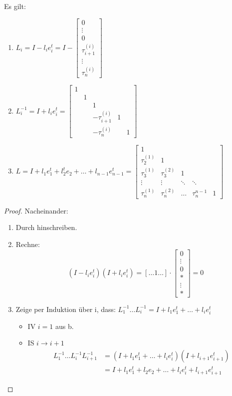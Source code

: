 \begin{lemma}
	Es gilt:
	\begin{enumerate}
		\item $L_i = I-l_i e_i^{t} = I- \begin{bmatrix}
		0 \\ \vdots \\ 0 \\ \tau_{i+1}^{(i)} \\ \vdots \\ \tau_n^{(i)}
		\end{bmatrix}$ 
		\item $L_i^{-1} = I+ l_i e_i^{t} = \begin{bmatrix}
			1 & & & & \\
                  & 1 & & & \\
                  & & 1 & & \\
                  & & -\tau_{i+1}^{(i)}& 1 & \\
                  & & -\tau_n^{(i)}& & 1
		\end{bmatrix}$
	\item $L= I+ l_1e_1^{t}+ l_2^{t}e_2+\ldots+ l_{n-1} e_{n-1}^{t}= \begin{bmatrix}
			1 & \\
			\tau_2^{(1)} & 1 \\
			\tau_3^{(1)} & \tau_3^{(2)} & 1 \\
			\vdots & \vdots & \ddots & \ddots \\
			\tau_n^{(1)} & \tau_n^{(2)} &  \ldots &\tau_n^{n-1} & 1
	\end{bmatrix}$ 
	\end{enumerate}

\end{lemma}
\begin{proof} Nacheinander:
\begin{enumerate}
	\item Durch hinschreiben.
	\item Rechne: 
		\[
			(I-l_i e_i^{t}) (I+l_ie_i^{t}) = [\ldots 1 \ldots] \cdot \begin{bmatrix}
				0 \\ \vdots \\ 0 \\ * \\ \vdots \\ *
			\end{bmatrix} = 0 
		\]
	\item Zeige per Induktion über i, dass: $L_1^{-1} \ldots L_i^{-1} = I + l_1e_1^{t} + \ldots + l_ie_i^{t}$
		\begin{itemize}[label=$\lozenge$, itemsep=2ex]
			\item IV \underline{$i=1$} aus b.
			\item IS \underline{$i \to i+1$} 
			\begin{align*}
			L_1^{-1} \ldots L_i^{-1} L_{i+1}^{-1} &= (I+ l_1e_1^{t}+\ldots+ l_ie_i^{t}) (I+l_{i+1} e_{i+1}^{t}) \\
	&= I + l_1e_1^{t}+l_2e_2 + \ldots + l_ie_i^{t}+ l_{i+1}e_{i+1}^{t}
			\end{align*}
		\end{itemize}
\end{enumerate}
\end{proof}
